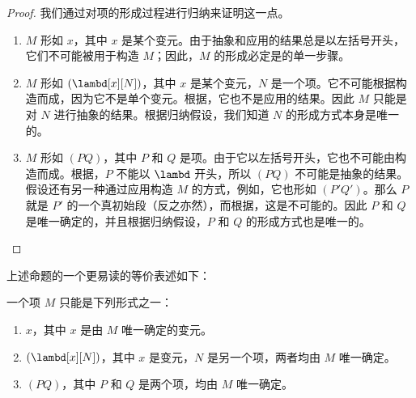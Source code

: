 \documentclass[../../../include/open-logic-section]{subfiles}
\begin{document}
\begin{proof}
我们通过对项的形成过程进行归纳来证明这一点。
\begin{enumerate}
\item $M$ 形如 $x$，其中 $x$ 是某个变元。由于抽象和应用的结果总是以左括号开头，它们不可能被用于构造 $M$；因此，$M$ 的形成必定是的单一步骤。
\item $M$ 形如 $(\lambd[x][N])$，其中 $x$ 是某个变元，$N$ 是一个项。它不可能根据构造而成，因为它不是单个变元。根据，它也不是应用的结果。因此 $M$ 只能是对 $N$ 进行抽象的结果。根据归纳假设，我们知道 $N$ 的形成方式本身是唯一的。
\item $M$ 形如 $(PQ)$，其中 $P$ 和 $Q$ 是项。由于它以左括号开头，它也不可能由构造而成。根据，$P$ 不能以 $\lambd$ 开头，所以 $(PQ)$ 不可能是抽象的结果。假设还有另一种通过应用构造 $M$ 的方式，例如，它也形如 $(P'Q')$。那么 $P$ 就是 $P'$ 的一个真初始段（反之亦然），而根据，这是不可能的。因此 $P$ 和 $Q$ 是唯一确定的，并且根据归纳假设，$P$ 和 $Q$ 的形成方式也是唯一的。
\end{enumerate}
\end{proof}

上述命题的一个更易读的等价表述如下：

\begin{prop}
一个项 $M$ 只能是下列形式之一：
\begin{enumerate}
\item $x$，其中 $x$ 是由 $M$ 唯一确定的变元。
\item $(\lambd[x][N])$，其中 $x$ 是变元，$N$ 是另一个项，两者均由 $M$ 唯一确定。
\item $(PQ)$，其中 $P$ 和 $Q$ 是两个项，均由 $M$ 唯一确定。
\end{enumerate}
\end{prop}
\end{document}
